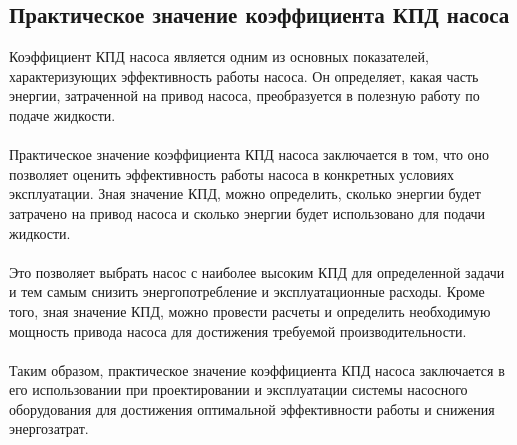 \documentclass{article}
\begin{document}
\subsection{Практическое значение коэффициента КПД насоса}
Коэффициент КПД насоса является одним из основных показателей, характеризующих эффективность работы насоса. Он определяет, какая часть энергии, затраченной на привод насоса, преобразуется в полезную работу по подаче жидкости.\\
~\\
Практическое значение коэффициента КПД насоса заключается в том, что оно позволяет оценить эффективность работы насоса в конкретных условиях эксплуатации. Зная значение КПД, можно определить, сколько энергии будет затрачено на привод насоса и сколько энергии будет использовано для подачи жидкости.\\
~\\
Это позволяет выбрать насос с наиболее высоким КПД для определенной задачи и тем самым снизить энергопотребление и эксплуатационные расходы. Кроме того, зная значение КПД, можно провести расчеты и определить необходимую мощность привода насоса для достижения требуемой производительности.\\
~\\
Таким образом, практическое значение коэффициента КПД насоса заключается в его использовании при проектировании и эксплуатации системы насосного оборудования для достижения оптимальной эффективности работы и снижения энергозатрат.\\
~\\

\newpage
\end{document}
